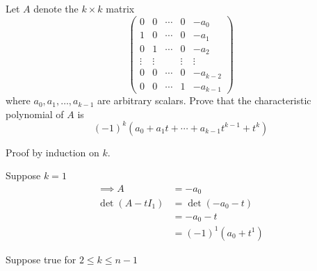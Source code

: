 Let $A$ denote the $k\times k$ matrix
\[
\begin{pmatrix}
0 & 0 & \cdots & 0 & -a_0\\
1 & 0 & \cdots & 0 & -a_1\\
0 & 1 & \cdots & 0 & -a_2\\
\vdots& \vdots & & \vdots & \vdots\\
0 & 0 & \cdots & 0 & -a_{k-2}\\
0 & 0 & \cdots & 1 & -a_{k-1}
\end{pmatrix}
\]
where $a_0,a_1,\dotsc,a_{k-1}$ are arbitrary scalars. Prove that the
characteristic polynomial of $A$ is
\[
(-1)^k(a_0 +a_1t + \dotsb + a_{k-1}t^{k-1} + t^k)
\]

Proof by induction on $k.$

Suppose $k=1$
\begin{align}
\implies A &= -a_0\\
\det{(A- tI_1)} &= \det{(-a_0 -t)} \\
&= -a_0 -t \\
&= (-1)^1(a_0 + t^1)
\end{align}

Suppose true for $2 \leq k \leq n-1$

